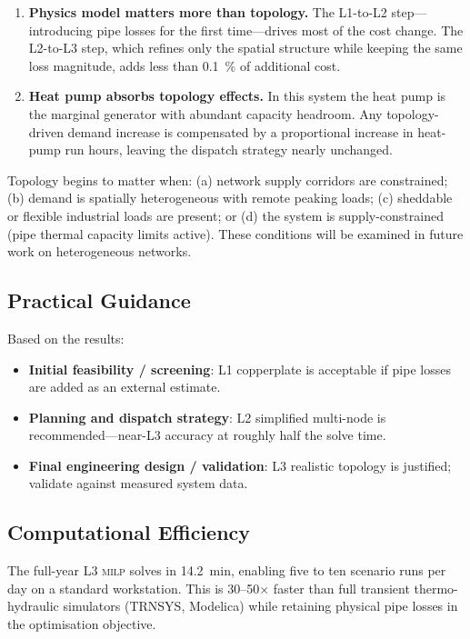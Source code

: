\documentclass[a4paper,fleqn]{cas-sc}
\newcommand{\milp}{\textsc{milp}}
\begin{document}
\begin{enumerate}
  \item \textbf{Physics model matters more than topology.}
        The L1-to-L2 step---introducing pipe losses for the first time---drives
        most of the cost change.  The L2-to-L3 step, which refines only the
        spatial structure while keeping the same loss magnitude, adds less
        than \SI{0.1}{\percent} of additional cost.

  \item \textbf{Heat pump absorbs topology effects.}
        In this system the heat pump is the marginal generator with abundant
        capacity headroom.  Any topology-driven demand increase is compensated
        by a proportional increase in heat-pump run hours, leaving the dispatch
        strategy nearly unchanged.
\end{enumerate}

Topology begins to matter when: (a) network supply corridors are constrained;
(b) demand is spatially heterogeneous with remote peaking loads; (c)
sheddable or flexible industrial loads are present; or (d) the system is
supply-constrained (pipe thermal capacity limits active).  These conditions
will be examined in future work on heterogeneous networks.

\subsection{Practical Guidance}

Based on the results:

\begin{itemize}
  \item \textbf{Initial feasibility / screening}: L1 copperplate is
        acceptable if pipe losses are added as an external estimate.
  \item \textbf{Planning and dispatch strategy}: L2 simplified multi-node
        is recommended---near-L3 accuracy at roughly half the solve time.
  \item \textbf{Final engineering design / validation}: L3 realistic topology
        is justified; validate against measured system data.
\end{itemize}

\subsection{Computational Efficiency}

The full-year L3 \milp{} solves in \SI{14.2}{min}, enabling five to ten
scenario runs per day on a standard workstation.  This is \numrange{30}{50}$\times$
faster than full transient thermo-hydraulic simulators (TRNSYS, Modelica)
while retaining physical pipe losses in the optimisation objective.
\end{document}

